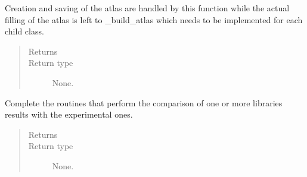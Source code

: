 \documentclass[letterpaper,10pt,english]{sphinxmanual}
\begin{document}
\begin{fulllineitems}
\begin{fulllineitems}
\begin{quote}
\begin{description}
\end{description}\end{quote}

\end{fulllineitems}


\begin{fulllineitems}
\label{\detokenize{api/postprocessing:expoutput.ExperimentalOutput.build_atlas}}
Creation and saving of the atlas are handled by this function while
the actual filling of the atlas is left to \_build\_atlas which needs
to be implemented for each child class.
\begin{quote}\begin{description}
\item[{Returns}] \leavevmode


\item[{Return type}] \leavevmode
None.

\end{description}\end{quote}

\end{fulllineitems}


\begin{fulllineitems}
\label{\detokenize{api/postprocessing:expoutput.ExperimentalOutput.compare}}
Complete the routines that perform the comparison of one or more
libraries results with the experimental ones.
\begin{quote}\begin{description}
\item[{Returns}] \leavevmode


\item[{Return type}] \leavevmode
None.

\end{description}\end{quote}

\end{fulllineitems}



\end{fulllineitems}
\end{document}
